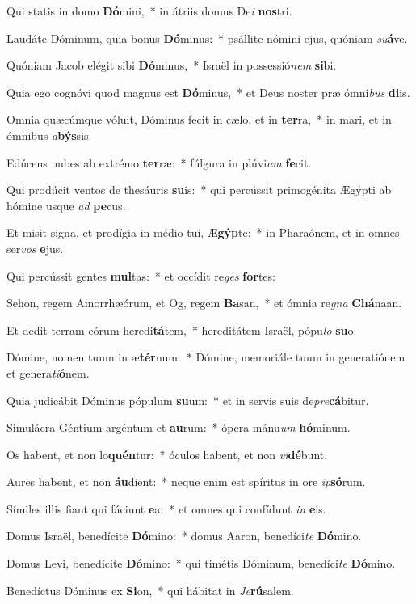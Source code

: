 \item Qui statis in domo \textbf{Dó}mini,~* in átriis domus De\textit{i} \textbf{nos}tri.
\item Laudáte Dóminum, quia bonus \textbf{Dó}minus:~* psállite nómini ejus, quóniam \textit{su}\textbf{á}ve.
\item Quóniam Jacob elégit sibi \textbf{Dó}minus,~* Israël in possessió\textit{nem} \textbf{si}bi.
\item Quia ego cognóvi quod magnus est \textbf{Dó}minus,~* et Deus noster præ ómni\textit{bus} \textbf{di}is.
\item Omnia quæcúmque vóluit, Dóminus fecit in cælo, et in \textbf{ter}ra,~* in mari, et in ómnibus \textit{a}\textbf{býs}sis.
\item Edúcens nubes ab extrémo \textbf{ter}ræ:~* fúlgura in plúvi\textit{am} \textbf{fe}cit.
\item Qui prodúcit ventos de thesáuris \textbf{su}is:~* qui percússit primogénita Ægýpti ab hómine usque \textit{ad} \textbf{pe}cus.
\item Et misit signa, et prodígia in médio tui, Æ\textbf{gýp}te:~* in Pharaónem, et in omnes ser\textit{vos} \textbf{e}jus.
\item Qui percússit gentes \textbf{mul}tas:~* et occídit re\textit{ges} \textbf{for}tes:
\item Sehon, regem Amorrhæórum, et Og, regem \textbf{Ba}san,~* et ómnia re\textit{gna} \textbf{Chá}naan.
\item Et dedit terram eórum heredi\textbf{tá}tem,~* hereditátem Israël, pópu\textit{lo} \textbf{su}o.
\item Dómine, nomen tuum in æ\textbf{tér}num:~* Dómine, memoriále tuum in generatiónem et genera\textit{ti}\textbf{ó}nem.
\item Quia judicábit Dóminus pópulum \textbf{su}um:~* et in servis suis de\textit{pre}\textbf{cá}bitur.
\item Simulácra Géntium argéntum et \textbf{au}rum:~* ópera mánu\textit{um} \textbf{hó}minum.
\item Os habent, et non lo\textbf{quén}tur:~* óculos habent, et non \textit{vi}\textbf{dé}bunt.
\item Aures habent, et non \textbf{áu}dient:~* neque enim est spíritus in ore \textit{ip}\textbf{só}rum.
\item Símiles illis fiant qui fáciunt \textbf{e}a:~* et omnes qui confídunt \textit{in} \textbf{e}is.
\item Domus Israël, benedícite \textbf{Dó}mino:~* domus Aaron, benedíci\textit{te} \textbf{Dó}mino.
\item Domus Levi, benedícite \textbf{Dó}mino:~* qui timétis Dóminum, benedíci\textit{te} \textbf{Dó}mino.
\item Benedíctus Dóminus ex \textbf{Si}on,~* qui hábitat in \textit{Je}\textbf{rú}salem.
